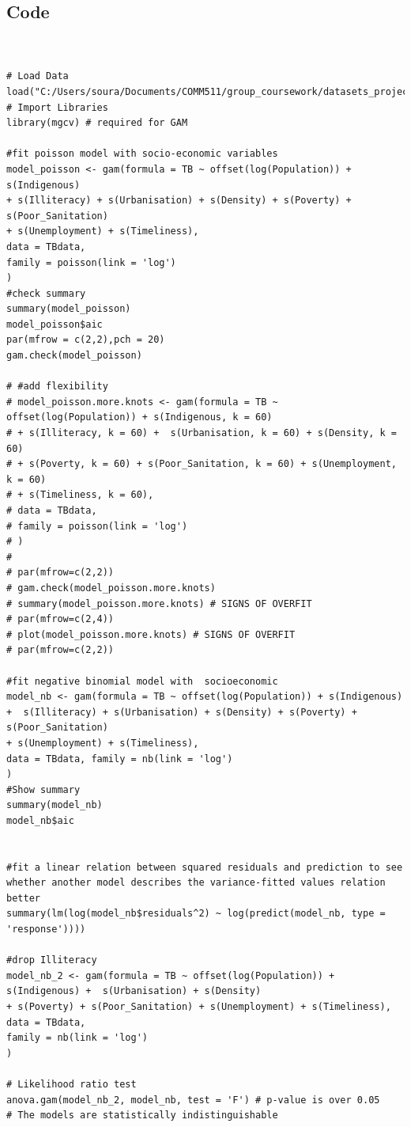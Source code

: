 \subsection{Code}
\begin{verbatim}


# Load Data
load("C:/Users/soura/Documents/COMM511/group_coursework/datasets_project.RData")
# Import Libraries
library(mgcv) # required for GAM 

#fit poisson model with socio-economic variables
model_poisson <- gam(formula = TB ~ offset(log(Population)) + s(Indigenous)
+ s(Illiteracy) + s(Urbanisation) + s(Density) + s(Poverty) + s(Poor_Sanitation)
+ s(Unemployment) + s(Timeliness), 
data = TBdata, 
family = poisson(link = 'log')
)
#check summary
summary(model_poisson)
model_poisson$aic
par(mfrow = c(2,2),pch = 20)
gam.check(model_poisson)

# #add flexibility
# model_poisson.more.knots <- gam(formula = TB ~ offset(log(Population)) + s(Indigenous, k = 60) 
# + s(Illiteracy, k = 60) +  s(Urbanisation, k = 60) + s(Density, k = 60) 
# + s(Poverty, k = 60) + s(Poor_Sanitation, k = 60) + s(Unemployment, k = 60) 
# + s(Timeliness, k = 60), 
# data = TBdata, 
# family = poisson(link = 'log')
# )
# 
# par(mfrow=c(2,2))
# gam.check(model_poisson.more.knots)
# summary(model_poisson.more.knots) # SIGNS OF OVERFIT
# par(mfrow=c(2,4))
# plot(model_poisson.more.knots) # SIGNS OF OVERFIT
# par(mfrow=c(2,2))

#fit negative binomial model with  socioeconomic
model_nb <- gam(formula = TB ~ offset(log(Population)) + s(Indigenous) 
+  s(Illiteracy) + s(Urbanisation) + s(Density) + s(Poverty) + s(Poor_Sanitation)
+ s(Unemployment) + s(Timeliness), 
data = TBdata, family = nb(link = 'log')
)
#Show summary
summary(model_nb)
model_nb$aic


#fit a linear relation between squared residuals and prediction to see whether another model describes the variance-fitted values relation better
summary(lm(log(model_nb$residuals^2) ~ log(predict(model_nb, type = 'response'))))

#drop Illiteracy
model_nb_2 <- gam(formula = TB ~ offset(log(Population)) + s(Indigenous) +  s(Urbanisation) + s(Density) 
+ s(Poverty) + s(Poor_Sanitation) + s(Unemployment) + s(Timeliness),
data = TBdata,
family = nb(link = 'log')
)

# Likelihood ratio test
anova.gam(model_nb_2, model_nb, test = 'F') # p-value is over 0.05
# The models are statistically indistinguishable


\end{verbatim}
